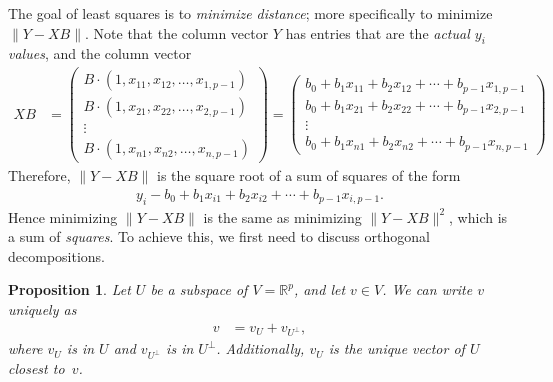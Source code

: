 \documentclass[a4paper, 12pt]{article}
\numberwithin{equation}{section}
\numberwithin{figure}{section}
\newtheorem{prop}[thm]{Proposition}
\theoremstyle{definition}
\newcommand{\R}{\mathbb{R}}
\begin{document}
The goal of least squares is to \textit{minimize distance}; more specifically to
minimize $\|Y - XB\|$. Note that the column vector $Y$ has entries that are the
\textit{actual $y_i$ values}, and the column vector 
\begin{align*}
	XB &= \begin{pmatrix}
		B\cdot (1, x_{11}, x_{12}, \dots, x_{1,p-1}) \\ 
		B\cdot (1, x_{21}, x_{22}, \dots, x_{2,p-1}) \\ 
		\vdots \\
		B\cdot (1, x_{n1}, x_{n2}, \dots, x_{n,p-1}) 
	\end{pmatrix} = \begin{pmatrix}
		b_0 + b_1x_{11} + b_2x_{12} + \cdots + b_{p-1}x_{1,p-1} \\ 
		b_0 + b_1x_{21} + b_2x_{22} + \cdots + b_{p-1}x_{2,p-1} \\ 
		\vdots \\
		b_0 + b_1x_{n1} + b_2x_{n2} + \cdots + b_{p-1}x_{n,p-1}
	\end{pmatrix}
\end{align*}
Therefore, $\| Y - XB \|$ is the square root of a sum of squares of the form 
\begin{align*}
	y_i - b_0 + b_1x_{i1} + b_2x_{i2} + \cdots + b_{p-1}x_{i,p-1}.
\end{align*}
Hence minimizing $\| Y - XB \|$ is the same as minimizing $\| Y - XB \|^2$,
which is a sum of \textit{squares}. To achieve this, we first need to discuss
orthogonal decompositions. 


\begin{prop}\label{prop:orthogonal-decomp}
	Let $U$ be a subspace of $V=\R^p$, and let $v\in V$. We can write $v$
	uniquely as 
	\begin{align*}
		v &= v_U + v_{U^{\perp}},
	\end{align*}
	where $v_U$ is in $U$ and $v_{U^{\perp}}$ is in $U^{\perp}$. Additionally,
	$v_U$ is the unique vector of $U$ closest to~$v$.
\end{prop}
\end{document}
